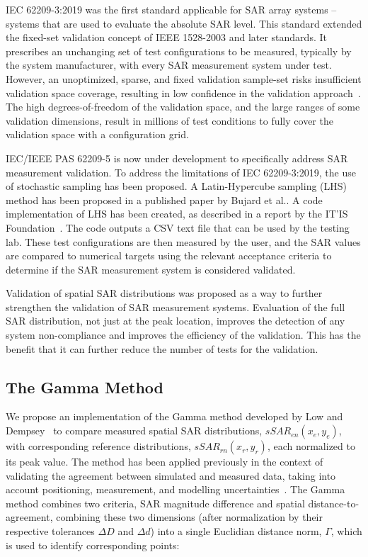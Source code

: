 \documentclass{./class/itisreport}
\begin{document}
IEC 62209-3:2019 was the first standard applicable for SAR array systems -- systems that are used to evaluate the absolute SAR level. This standard extended the fixed-set validation concept of IEEE 1528-2003 and later standards. It prescribes an unchanging set of test configurations to be measured, typically by the system manufacturer, with every SAR measurement system under test. However, an unoptimized, sparse, and fixed validation sample-set risks insufficient validation space coverage, resulting in low confidence in the validation approach~\cite{bujard2024}. The high degrees-of-freedom of the validation space, and the large ranges of some validation dimensions, result in millions of test conditions to fully cover the validation space with a configuration grid.

IEC/IEEE PAS 62209-5 is now under development to specifically address SAR measurement validation.
To address the limitations of IEC 62209-3:2019, the use of stochastic sampling has been proposed. A Latin-Hypercube sampling (LHS) method has been proposed in a published paper by Bujard et al.\cite{bujard2024}. A code implementation of LHS has been created, as described in a report by the IT'IS Foundation~\cite{lhsreport_2025}. The code outputs a CSV text file that can be used by the testing lab. These test configurations are then measured by the user, and the SAR values are compared to numerical targets using the relevant acceptance criteria to determine if the SAR measurement system is considered validated.

Validation of spatial SAR distributions was proposed as a way to further strengthen the validation of SAR measurement systems. Evaluation of the full SAR distribution, not just at the peak location, improves the detection of any system non-compliance and improves the efficiency of the validation. This has the benefit that it can further reduce the number of tests for the validation.

\subsection{The Gamma Method} \label{sec:g-intro}

We propose an implementation of the Gamma method developed by Low and Dempsey~\cite{low-dempsey} to compare measured spatial SAR distributions, $sSAR_{en}(x_e,y_e)$, with corresponding reference distributions, $sSAR_{rn}(x_r,y_r)$, each normalized to its peak value. The method has been applied previously in the context of validating the agreement between simulated and measured data, taking into account positioning, measurement, and modelling uncertainties~\cite{neufeld2016}. The Gamma method combines two criteria, SAR magnitude difference and spatial distance-to-agreement, combining these two dimensions (after normalization by their respective tolerances $\Delta D$ and $\Delta d$) into a single Euclidian distance norm, $\Gamma$, which is used to identify corresponding points: 
\end{document}
